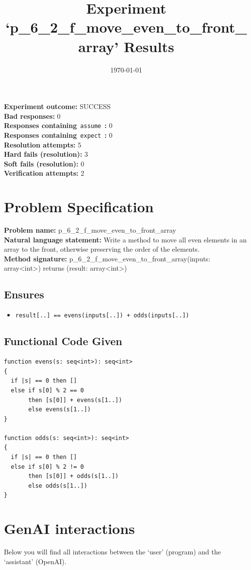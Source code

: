 \documentclass{article}
\begin{document}
\title{Experiment `p\_6\_2\_f\_move\_even\_to\_front\_array' Results}
\author{\today}
\date{}
\maketitle
\textbf{Experiment outcome: }SUCCESS
\\\textbf{Bad responses: }0
\\\textbf{Responses containing}~\texttt{assume}~\textbf{: }0
\\\textbf{Responses containing}~\texttt{expect}~\textbf{: }0
\\\textbf{Resolution attempts: }5
\\\textbf{Hard fails (resolution): }3
\\\textbf{Soft fails (resolution): }0
\\\textbf{Verification attempts: }2
\section*{Problem Specification}
\textbf{Problem name: }p\_6\_2\_f\_move\_even\_to\_front\_array
\\\textbf{Natural language statement: }Write a method to move all even elements in an array to the front, otherwise preserving the order of the elements.
\\\textbf{Method signature: }p\_6\_2\_f\_move\_even\_to\_front\_array(inputs: array<int>) returns (result: array<int>)
\subsection*{Ensures}
\begin{itemize}
\item \texttt{result[..] == evens(inputs[..]) + odds(inputs[..])}
\end{itemize}
\subsection*{Functional Code Given}
\begin{lstlisting}
function evens(s: seq<int>): seq<int>
{
  if |s| == 0 then []
  else if s[0] % 2 == 0
       then [s[0]] + evens(s[1..])
       else evens(s[1..])
}

function odds(s: seq<int>): seq<int>
{
  if |s| == 0 then []
  else if s[0] % 2 != 0
       then [s[0]] + odds(s[1..])
       else odds(s[1..])
}
\end{lstlisting}
\clearpage
\section*{GenAI interactions}
Below you will find all interactions between the `user' (program) and the `assistant' (OpenAI).
\end{document}
